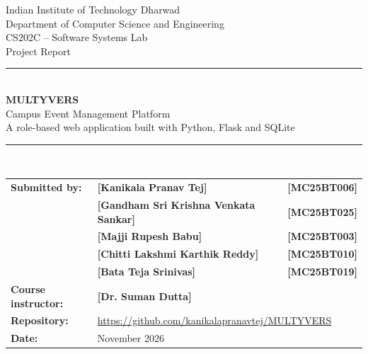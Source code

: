 \documentclass[11pt,a4paper]{article}
\newcommand{\placeholder}[1]{\textbf{\textcolor{red!60!black}{[#1]}}}
\begin{document}
\begin{titlepage}
\centering
\vspace*{1.2cm}
{\large Indian Institute of Technology Dharwad}\\[4pt]
{\normalsize Department of Computer Science and Engineering}\\[1.6cm]
{\normalsize CS202C -- Software Systems Lab}\\[0.4cm]
{\normalsize Project Report}\\[1.2cm]
\rule{\textwidth}{0.8pt}\\[0.5cm]
{\fontsize{30}{34}\selectfont\bfseries\color{accent} MULTYVERS}\\[0.3cm]
{\Large Campus Event Management Platform}\\[0.2cm]
{\normalsize A role-based web application built with Python, Flask and SQLite}\\[0.4cm]
\rule{\textwidth}{0.8pt}\\[1.6cm]



\begin{tabular}{@{}l l l@{}}
\textbf{Submitted by:} 
& \placeholder{Kanikala Pranav Tej} 
& \placeholder{MC25BT006}\\

& \placeholder{Gandham Sri Krishna Venkata Sankar} 
& \placeholder{MC25BT025}\\

& \placeholder{Majji Rupesh Babu} 
& \placeholder{MC25BT003}\\

& \placeholder{Chitti Lakshmi Karthik Reddy} 
& \placeholder{MC25BT010}\\

& \placeholder{Bata Teja Srinivas} 
& \placeholder{MC25BT019}\\[6pt]

\textbf{Course instructor:} 
& \multicolumn{2}{l}{\placeholder{Dr. Suman Dutta}}\\[6pt]

\textbf{Repository:} 
& \multicolumn{2}{l}{\url{https://github.com/kanikalapranavtej/MULTYVERS}}\\

\textbf{Date:} & \multicolumn{2}{l}{November 2026}
\end{tabular}

\vfill
\end{titlepage}

\tableofcontents
\clearpage
\listoffigures
\listoftables
\clearpage
{}
\end{document}
